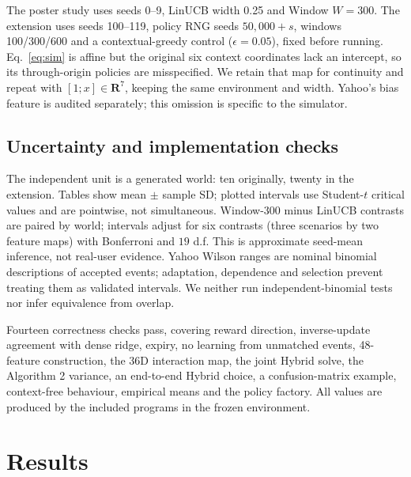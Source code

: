 \documentclass[10pt,a4paper]{article}
\begin{document}
The poster study uses seeds 0--9, LinUCB width 0.25 and Window $W=300$.
The extension uses seeds 100--119, policy RNG seeds $50{,}000+s$, windows
100/300/600 and a contextual-greedy control ($\epsilon=0.05$), fixed before
running. Eq.~\eqref{eq:sim} is affine but the original six context
coordinates lack an intercept, so its through-origin policies are
misspecified. We retain that map for continuity and repeat with
$[1;x]\in\mathbf R^7$, keeping the same environment and width. Yahoo's bias
feature is audited separately; this omission is specific to the simulator.

\subsection{Uncertainty and implementation checks}
The independent unit is a generated world: ten originally, twenty in the
extension. Tables show mean $\pm$ sample SD; plotted intervals use Student-$t$
critical values and are pointwise, not simultaneous. Window-300 minus
LinUCB contrasts are paired by world; intervals adjust for six contrasts
(three scenarios by two feature maps) with Bonferroni and $19$ d.f. This is
approximate seed-mean inference, not real-user evidence. Yahoo Wilson
ranges are nominal binomial descriptions of accepted events; adaptation,
dependence and selection prevent treating them as validated intervals. We
neither run independent-binomial tests nor infer equivalence from overlap.

Fourteen correctness checks pass, covering reward direction, inverse-update
agreement with dense ridge, expiry, no learning from unmatched events,
48-feature construction, the 36D interaction map, the joint Hybrid solve,
the Algorithm 2 variance, an end-to-end Hybrid choice, a confusion-matrix
example, context-free behaviour, empirical means and the policy factory.
All values are produced by the included programs in the frozen environment.

\section{Results}
\end{document}
